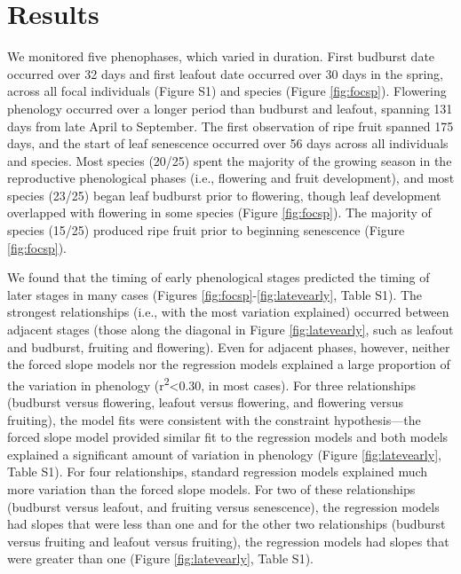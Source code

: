 \documentclass{article}
\begin{document}
\section* {Results}
\par We monitored five phenophases, which varied in duration. First budburst date occurred over 32 days and first leafout date occurred over 30 days in the spring, across all focal individuals (Figure S1) and species (Figure \ref{fig:focsp}). Flowering phenology occurred over a longer period than budburst and leafout, spanning 131 days from late April to September. The first observation of ripe fruit spanned 175 days, and the start of leaf senescence occurred over 56 days across all individuals and species. Most species (20/25) spent the majority of the growing season in the reproductive phenological phases (i.e., flowering and fruit development), and most species (23/25) began leaf budburst prior to flowering, though leaf development overlapped with flowering in some species (Figure \ref{fig:focsp}). The majority of species (15/25) produced ripe fruit prior to beginning senescence (Figure \ref{fig:focsp}). 

\par We found that the timing of early phenological stages predicted the timing of later stages in many cases (Figures \ref{fig:focsp}-\ref{fig:latevearly}, Table S1). The strongest relationships (i.e., with the most variation explained) occurred between adjacent stages (those along the diagonal in Figure \ref{fig:latevearly}, such as leafout and budburst, fruiting and flowering). Even for adjacent phases, however, neither the forced slope models nor the regression models explained a large proportion of the variation in phenology (r\textsuperscript{2}<0.30, in most cases). For three relationships (budburst versus flowering, leafout versus flowering, and flowering versus fruiting), the model fits were consistent with the constraint hypothesis---the forced slope model provided similar fit to the regression models and both models explained a significant amount of variation in phenology (Figure \ref{fig:latevearly}, Table S1). For four relationships, standard regression models explained much more variation than the forced slope models. For two of these relationships (budburst versus leafout, and fruiting versus senescence), the regression models had slopes that were less than one and for the other two relationships (budburst versus fruiting and leafout versus fruiting), the regression models had slopes that were greater than one (Figure \ref{fig:latevearly}, Table S1).
\end{document}
